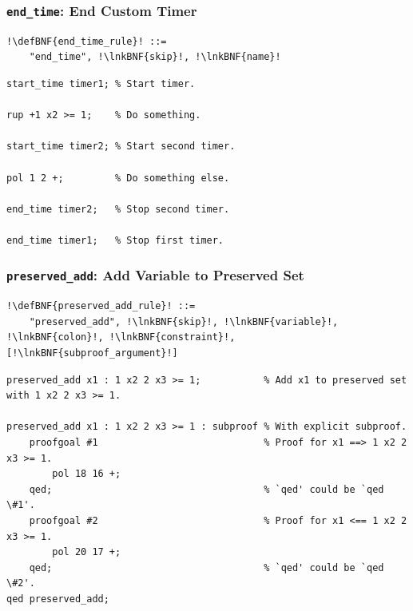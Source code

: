 \documentclass[a4paper]{article}
\newcommand{\defBNF}[1]{\hypertarget{def:#1}{<\detokenize{#1}>}}
\newcommand{\lnkBNF}[1]{\hyperlink{def:#1}{<\detokenize{#1}>}}
\begin{document}
\subsubsection{\texttt{end\_time}: End Custom Timer}\label{sec:rules-end-time}
\begin{lstlisting}
!\defBNF{end_time_rule}! ::=
	"end_time", !\lnkBNF{skip}!, !\lnkBNF{name}!
\end{lstlisting}
\begin{lstlisting}[language=veripb]
start_time timer1; % Start timer.

rup +1 x2 >= 1;    % Do something.

start_time timer2; % Start second timer.

pol 1 2 +;         % Do something else.

end_time timer2;   % Stop second timer.

end_time timer1;   % Stop first timer.
\end{lstlisting}


\subsubsection{\texttt{preserved\_add}: Add Variable to Preserved Set}\label{sec:rules-preserved-add}
\begin{lstlisting}
!\defBNF{preserved_add_rule}! ::=
	"preserved_add", !\lnkBNF{skip}!, !\lnkBNF{variable}!, !\lnkBNF{colon}!, !\lnkBNF{constraint}!, [!\lnkBNF{subproof_argument}!]
\end{lstlisting}
\begin{lstlisting}[language=veripb]
preserved_add x1 : 1 x2 2 x3 >= 1;           % Add x1 to preserved set with 1 x2 2 x3 >= 1.

preserved_add x1 : 1 x2 2 x3 >= 1 : subproof % With explicit subproof.
    proofgoal #1                             % Proof for x1 ==> 1 x2 2 x3 >= 1.
        pol 18 16 +;
    qed;                                     % `qed' could be `qed \#1'.
    proofgoal #2                             % Proof for x1 <== 1 x2 2 x3 >= 1.
        pol 20 17 +;
    qed;                                     % `qed' could be `qed \#2'.
qed preserved_add;
\end{lstlisting}
\end{document}
